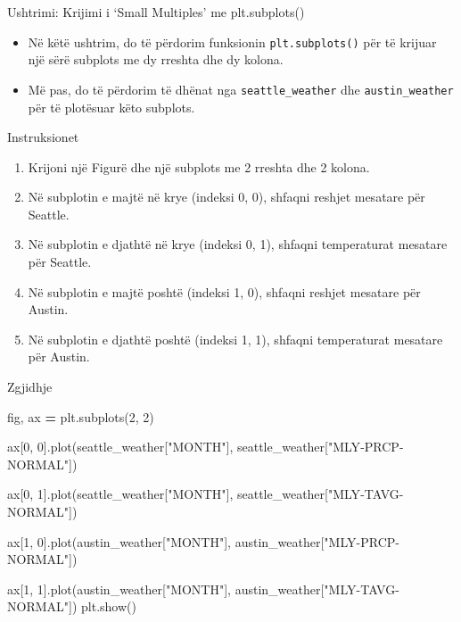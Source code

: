 \documentclass[
  ignorenonframetext,
]{beamer}
\newenvironment{Shaded}{\begin{snugshade}}{\end{snugshade}}
\newcommand{\DecValTok}[1]{\textcolor[rgb]{0.00,0.00,0.81}{#1}}
\newcommand{\NormalTok}[1]{#1}
\newcommand{\OperatorTok}[1]{\textcolor[rgb]{0.81,0.36,0.00}{\textbf{#1}}}
\newcommand{\StringTok}[1]{\textcolor[rgb]{0.31,0.60,0.02}{#1}}
\begin{document}
\begin{frame}[fragile]{Ushtrimi: Krijimi i `Small Multiples' me
plt.subplots()}
\protect\hypertarget{ushtrimi-krijimi-i-small-multiples-me-plt.subplots}{}
\begin{itemize}
\item
  Në këtë ushtrim, do të përdorim funksionin \texttt{plt.subplots()} për
  të krijuar një sërë subplots me dy rreshta dhe dy kolona.
\item
  Më pas, do të përdorim të dhënat nga \texttt{seattle\_weather} dhe
  \texttt{austin\_weather} për të plotësuar këto subplots.
\end{itemize}
\end{frame}

\begin{frame}{Instruksionet}
\protect\hypertarget{instruksionet-4}{}
\begin{enumerate}
\item
  Krijoni një Figurë dhe një subplots me 2 rreshta dhe 2 kolona.
\item
  Në subplotin e majtë në krye (indeksi 0, 0), shfaqni reshjet mesatare
  për Seattle.
\item
  Në subplotin e djathtë në krye (indeksi 0, 1), shfaqni temperaturat
  mesatare për Seattle.
\item
  Në subplotin e majtë poshtë (indeksi 1, 0), shfaqni reshjet mesatare
  për Austin.
\item
  Në subplotin e djathtë poshtë (indeksi 1, 1), shfaqni temperaturat
  mesatare për Austin.
\end{enumerate}
\end{frame}

\begin{frame}[fragile]{Zgjidhje}
\protect\hypertarget{zgjidhje-4}{}

\begin{Shaded}
\begin{Highlighting}[]
\NormalTok{fig, ax }\OperatorTok{=}\NormalTok{ plt.subplots(}\DecValTok{2}\NormalTok{, }\DecValTok{2}\NormalTok{)}


\NormalTok{ax[}\DecValTok{0}\NormalTok{, }\DecValTok{0}\NormalTok{].plot(seattle\_weather[}\StringTok{"MONTH"}\NormalTok{], seattle\_weather[}\StringTok{"MLY{-}PRCP{-}NORMAL"}\NormalTok{])}


\NormalTok{ax[}\DecValTok{0}\NormalTok{, }\DecValTok{1}\NormalTok{].plot(seattle\_weather[}\StringTok{"MONTH"}\NormalTok{], seattle\_weather[}\StringTok{"MLY{-}TAVG{-}NORMAL"}\NormalTok{])}


\NormalTok{ax[}\DecValTok{1}\NormalTok{, }\DecValTok{0}\NormalTok{].plot(austin\_weather[}\StringTok{"MONTH"}\NormalTok{], austin\_weather[}\StringTok{"MLY{-}PRCP{-}NORMAL"}\NormalTok{])}


\NormalTok{ax[}\DecValTok{1}\NormalTok{, }\DecValTok{1}\NormalTok{].plot(austin\_weather[}\StringTok{"MONTH"}\NormalTok{], austin\_weather[}\StringTok{"MLY{-}TAVG{-}NORMAL"}\NormalTok{])}
\NormalTok{plt.show()}
\end{Highlighting}
\end{Shaded}
\end{frame}
\end{document}
